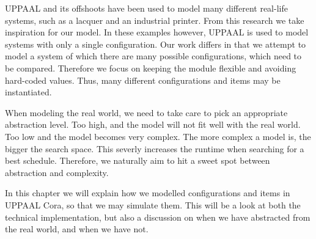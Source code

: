 UPPAAL and its offshoots have been used to model many different real-life systems, such as a lacquer\cite{so54514} and an industrial printer\cite{Igna2008}. From this research we take inspiration for our model. In these examples however, UPPAAL is used to model systems with only a single configuration. Our work differs in that we attempt to model a system of which there are many possible configurations, which need to be compared. Therefore we focus on keeping the module flexible and avoiding hard-coded values. Thus, many different configurations and items may be instantiated.

When modeling the real world, we need to take care to pick an appropriate abstraction level. Too high, and the model will not fit well with the real world. Too low and the model becomes very complex. The more complex a model is, the bigger the search space. This severly increases the runtime when searching for a best schedule. Therefore, we naturally aim to hit a sweet spot between abstraction and complexity.

In this chapter we will explain how we modelled configurations and items in UPPAAL Cora, so that we may simulate them. This will be a look at both the technical implementation, but also a discussion on when we have abstracted from the real world, and when we have not.  






